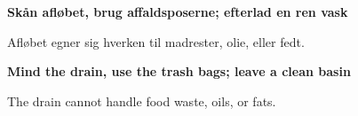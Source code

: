 \documentclass{article}
\begin{document}
\maketitle

\null

\vspace{-0.5cm}

\begin{center}

\vspace{1cm}%
\begin{center}%

\fontsize{28}{28}\selectfont\bf Skån afløbet, brug affaldsposerne; efterlad en
ren vask \\

\end{center}%
\vspace{0.7cm}%

\vspace{-0.7cm}

\Huge

Afløbet egner sig hverken til madrester, olie, eller fedt.

\english

\vspace{1.5cm}%
\begin{center}%

\fontsize{28}{28}\selectfont\bf Mind the drain, use the trash bags; leave a
clean basin

\end{center}%
\vspace{0.7cm}%

\vspace{-1.1cm}

The drain cannot handle food waste, oils, or fats.

\end{center}

\dansk

\underskriv
\end{document}
